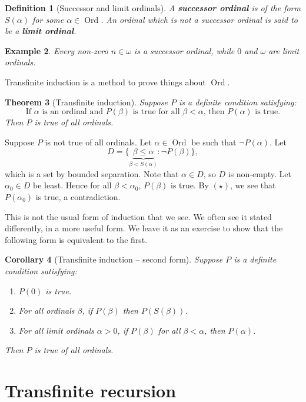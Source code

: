 \documentclass[10pt]{article}
\makeatletter
\DeclareMathOperator{\Ord}{Ord}
\theoremstyle{newstyle}
\newtheorem{thm}{Theorem}[section]
\newtheorem{cor}[thm]{Corollary}
\newtheorem{defn}[thm]{Definition}
\newtheorem{exmp}[thm]{Example}
\newenvironment{pf}[1][\proofname]{\par
  \pushQED{\qed}%
  \normalfont \topsep0\p@\relax
  \trivlist
  \item[\hskip\labelsep\scshape
  #1\@addpunct{.}]\ignorespaces
}{%
  \popQED\endtrivlist\@endpefalse
}
\makeatother
\begin{document}
\begin{defn}[Successor and limit ordinals] 
A {\bf successor ordinal} is of the form $S(\alpha)$ for some $\alpha \in \Ord$. An ordinal 
which is not a successor ordinal is said to be a {\bf limit ordinal}.
\end{defn} 

\begin{exmp}
Every non-zero $n \in \omega$ is a successor ordinal, while $0$ and $\omega$ are limit ordinals.
\end{exmp}

Transfinite induction is a method to prove things about $\Ord$.

\begin{thm}[Transfinite induction] 
Suppose $P$ is a definite condition satisfying: 
\[ \text{If $\alpha$ is an ordinal and $P(\beta)$ is true for all $\beta < \alpha$, then 
$P(\alpha)$ is true.} \tag{$\star$} \]
Then $P$ is true of all ordinals.
\end{thm}
\begin{pf} 
Suppose $P$ is not true of all ordinals. Let $\alpha \in \Ord$ be such that 
$\neg P(\alpha)$. Let 
\[ D =  \{\underbrace{\beta \leq \alpha}_{\beta < S(\alpha)} : \neg P(\beta)\}, \]
which is a set by bounded separation. Note that $\alpha \in D$, so $D$ is non-empty. 
Let $\alpha_0 \in D$ be least. Hence for all $\beta < \alpha_0$, $P(\beta)$ is true. 
By $(\star)$, we see that $P(\alpha_0)$ is true, a contradiction.
\end{pf}

This is not the usual form of induction that we see. We often see it stated differently, in a more useful 
form. We leave it as an exercise to show that the following form is equivalent to the first.

\begin{cor}[Transfinite induction -- second form]
Suppose $P$ is a definite condition satisfying:
\begin{enumerate}[(1)]
    \item $P(0)$ is true. 
    \item For all ordinals $\beta$, if $P(\beta)$ then $P(S(\beta))$. 
    \item For all limit ordinals $\alpha > 0$, if $P(\beta)$ for all $\beta < \alpha$, then $P(\alpha)$.
\end{enumerate} 
Then $P$ is true of all ordinals.
\end{cor}

%  
\newpage\section{Transfinite recursion}
\end{document}
